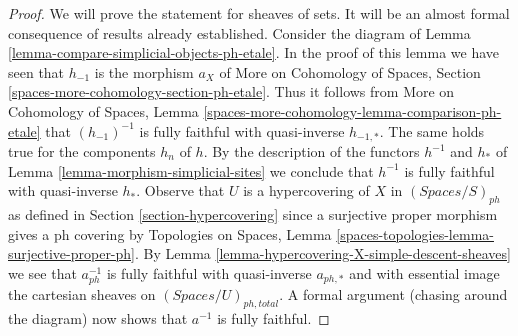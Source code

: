 \begin{proof}
We will prove the statement for sheaves of sets. It will be an
almost formal consequence of results already established.
Consider the diagram of
Lemma \ref{lemma-compare-simplicial-objects-ph-etale}.
In the proof of this lemma we have seen that
$h_{-1}$ is the morphism $a_X$ of
More on Cohomology of Spaces, Section
\ref{spaces-more-cohomology-section-ph-etale}.
Thus it follows from
More on Cohomology of Spaces, Lemma
\ref{spaces-more-cohomology-lemma-comparison-ph-etale}
that $(h_{-1})^{-1}$ is fully faithful with quasi-inverse $h_{-1, *}$.
The same holds true for the components $h_n$ of $h$.
By the description of the functors $h^{-1}$ and $h_*$ of
Lemma \ref{lemma-morphism-simplicial-sites}
we conclude that $h^{-1}$ is fully faithful with quasi-inverse $h_*$.
Observe that $U$ is a hypercovering of $X$ in $(\textit{Spaces}/S)_{ph}$
as defined in Section \ref{section-hypercovering} since a surjective
proper morphism gives a ph covering by Topologies on Spaces, Lemma
\ref{spaces-topologies-lemma-surjective-proper-ph}.
By Lemma \ref{lemma-hypercovering-X-simple-descent-sheaves}
we see that $a_{ph}^{-1}$ is fully faithful with quasi-inverse
$a_{ph, *}$ and with essential image the cartesian sheaves
on $(\textit{Spaces}/U)_{ph, total}$.
A formal argument (chasing around the diagram) now shows that
$a^{-1}$ is fully faithful.


\end{proof}
